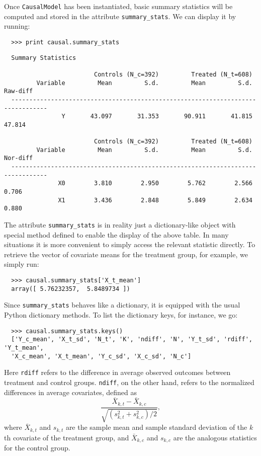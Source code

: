 \documentclass[12pt]{article}
\theoremstyle{definition}
\theoremstyle{definition}
\theoremstyle{definition}
\theoremstyle{remark}
\begin{document}
Once \texttt{CausalModel} has been instantiated, basic summary statistics will be computed and stored in the attribute \texttt{summary\_stats}. We can display it by running:
\begin{verbatim}
  >>> print causal.summary_stats
\end{verbatim}
\begin{verbatim}
  Summary Statistics
  
                         Controls (N_c=392)         Treated (N_t=608)             
         Variable         Mean         S.d.         Mean         S.d.     Raw-diff
  --------------------------------------------------------------------------------
                Y       43.097       31.353       90.911       41.815       47.814
  
                         Controls (N_c=392)         Treated (N_t=608)             
         Variable         Mean         S.d.         Mean         S.d.     Nor-diff
  --------------------------------------------------------------------------------
               X0        3.810        2.950        5.762        2.566        0.706
               X1        3.436        2.848        5.849        2.634        0.880
\end{verbatim}

The attribute \texttt{summary\_stats} is in reality just a dictionary-like object with special method defined to enable the display of the above table. In many situations it is more convenient to simply access the relevant statistic directly. To retrieve the vector of covariate means for the treatment group, for example, we simply run:
\begin{verbatim}
  >>> causal.summary_stats['X_t_mean']
  array([ 5.76232357,  5.8489734 ])
\end{verbatim}

Since \texttt{summary\_stats} behaves like a dictionary, it is equipped with the usual Python dictionary methods. To list the dictionary keys, for instance, we go:
\begin{verbatim}
  >>> causal.summary_stats.keys()
  ['Y_c_mean', 'X_t_sd', 'N_t', 'K', 'ndiff', 'N', 'Y_t_sd', 'rdiff', 'Y_t_mean',
  'X_c_mean', 'X_t_mean', 'Y_c_sd', 'X_c_sd', 'N_c']
\end{verbatim}

Here \texttt{rdiff} refers to the difference in average observed outcomes between treatment and control groups. \texttt{ndiff}, on the other hand, refers to the normalized differences in average covariates, defined as
\[\frac{\bar{X}_{k,t} - \bar{X}_{k,c}}{\sqrt{\left(s^2_{k,t}+s^2_{k,c}\right)\Big/ 2}},\]
where $\bar{X}_{k,t}$ and $s_{k,t}$ are the sample mean and sample standard deviation of the $k$th covariate of the treatment group, and $\bar{X}_{k,c}$ and $s_{k,c}$ are the analogous statistics for the control group.
\end{document}
